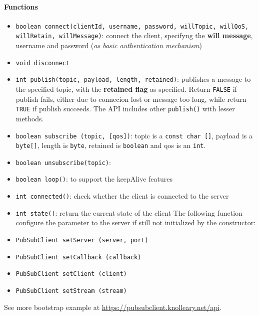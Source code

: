 \documentclass[10pt,a4paper]{report}
\theoremstyle{definition}
\begin{document}
\paragraph{Functions}\label{sec:functions}\begin{itemize}
	\item 
	\texttt{boolean connect(clientId, username, password, willTopic, willQoS, willRetain, willMessage)}: connect the client, specifyng the \textbf{will message}, username and password (\textit{as basic authentication mechanism})
	\item 
	\texttt{void disconnect}
	\item 
	\texttt{int publish(topic, payload, length, retained)}: publishes a message to the specified topic, with the \textbf{retained flag} as specified. Return \texttt{FALSE} if publish fails, either due to connecion lost or message too long, while return \texttt{TRUE} if publish succeeds. The API includes other \texttt{publish()} with lesser methods.
	\item 
	\texttt{boolean subscribe (topic, [qos])}: topic is a \texttt{const char []}, payload is a \texttt{byte[]}, length is \texttt{byte}, retained is \texttt{boolean} and qos is an \texttt{int}.
	\item 
	\texttt{boolean unsubscribe(topic)}:
	\item 
	\texttt{boolean loop()}: to support the keepAlive features
	\item 
	\texttt{int connected()}: check whether the client is connected to the server
	\item 
	\texttt{int state()}: return the current state of the client
	The following function configure the parameter to the server if still not initialized by the constructor:
	\item 
	\texttt{PubSubClient setServer (server, port)}
	\item 
	\texttt{PubSubClient setCallback (callback)}
	\item 
	\texttt{PubSubClient setClient (client)}
	\item 
	\texttt{PubSubClient setStream (stream)}

\end{itemize}

	See more bootstrap example at \href{https://pubsubclient.knolleary.net/api}{https://pubsubclient.knolleary.net/api}.
\fi
\end{document}
